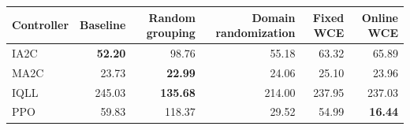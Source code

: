 \begin{tabular}{lrrrrr}
\hline
Controller & Baseline & Random grouping & Domain randomization & Fixed WCE & Online WCE \\
\hline
IA2C & \textbf{52.20} & 98.76 & 55.18 & 63.32 & 65.89 \\
MA2C & 23.73 & \textbf{22.99} & 24.06 & 25.10 & 23.96 \\
IQLL & 245.03 & \textbf{135.68} & 214.00 & 237.95 & 237.03 \\
PPO & 59.83 & 118.37 & 29.52 & 54.99 & \textbf{16.44} \\
\hline
\end{tabular}
